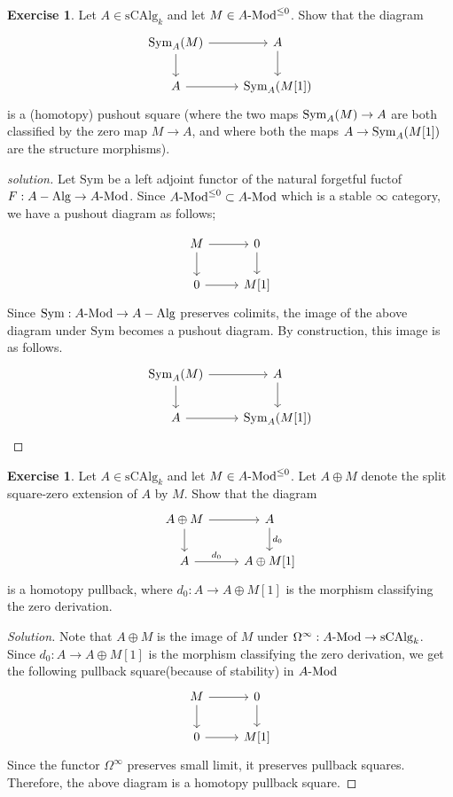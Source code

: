 \documentclass[10pt,a4paper,reqno,oneside]{book} %
\theoremstyle{plain}
\theoremstyle{definition}
\newtheorem{exercise}[thm]{Exercise}
\theoremstyle{remark}
\numberwithin{equation}{section}
\begin{document}
\begin{exercise}
	Let $A \in \mathrm{sCAlg}_k$ and let $M \in A\textrm{-}\mathrm{Mod}^{\le 0}$.
	Show that the diagram
	\[ \begin{tikzcd}
		\Sym_A(M) \arrow{r} \arrow{d} & A \arrow{d} \\
		A \arrow{r} & \Sym_A(M[1])
	\end{tikzcd} \]
	is a (homotopy) pushout square (where the two maps $\operatorname{Sym}_A(M) \to A$ are both classified by the zero map $M \to A$, and where both the maps $A \to \operatorname{Sym}_A(M[1])$ are the structure morphisms).
\end{exercise}

\ifpersonal
\begin{proof}[solution]
    Let $\mathrm{Sym}$ be a left adjoint functor of the natural forgetful fuctof $F: A-\mathrm{Alg} \to A\textrm{-}\mathrm{Mod}$. Since $A\textrm{-}\mathrm{Mod}^{\leq 0} \subset A\textrm{-}\mathrm{Mod}$ which is a stable $\infty$ category, we have a pushout diagram as follows;
    
    \[ \begin{tikzcd}
        M \arrow{r} \arrow{d} & 0 \arrow{d} \\
        0 \arrow{r} & M[1]
    \end{tikzcd} \]
    Since $\mathrm{Sym}:A\textrm{-}\mathrm{Mod} \to A-\mathrm{Alg}$ preserves colimits, the image of the above diagram under $\mathrm{Sym}$ becomes a pushout diagram. By construction, this image is as follows.
    \[ \begin{tikzcd}
		\Sym_A(M) \arrow{r} \arrow{d} & A \arrow{d} \\
		A \arrow{r} & \Sym_A(M[1])
	\end{tikzcd} \]
\end{proof}
\fi

\begin{exercise}
	Let $A \in \mathrm{sCAlg}_k$ and let $M \in A \textrm{-}\mathrm{Mod}^{\le 0}$.
	Let $A \oplus M$ denote the split square-zero extension of $A$ by $M$.
	Show that the diagram
	\[ \begin{tikzcd}
		A \oplus M \arrow{r} \arrow{d} & A \arrow{d}{d_0} \\
		A \arrow{r}{d_0} & A \oplus M[1]
	\end{tikzcd} \]
	is a homotopy pullback, where $d_0 \colon A \to A \oplus M[1]$ is the morphism classifying the zero derivation.
\end{exercise}

\ifpersonal
\begin{proof}[Solution]
    Note that $A\oplus M$ is the image of $M$ under $\Omega^{\infty}:A\textrm{-}\mathrm{Mod} \to \mathrm{sCAlg}_k$. Since $d_0 \colon A \to A \oplus M[1]$ is the morphism classifying the zero derivation, we get the following pullback square(because of stability) in $A\textrm{-}\mathrm{Mod}$
    \[ \begin{tikzcd}
		M \arrow{r} \arrow{d} & 0 \arrow{d} \\
		0 \arrow{r} & M[1]
	\end{tikzcd} \]
	Since the functor $\Omega^{\infty}$ preserves small limit, it preserves pullback squares. Therefore, the above diagram is a homotopy pullback square.

\end{proof}
\fi
\end{document}
